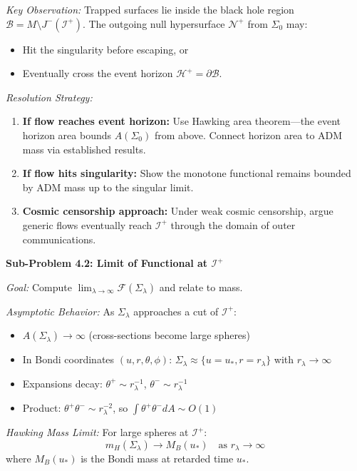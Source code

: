 \textit{Key Observation:} Trapped surfaces lie inside the black hole region $\mathcal{B} = M \setminus J^-(\mathscr{I}^+)$. The outgoing null hypersurface $\mathcal{N}^+$ from $\Sigma_0$ may:
\begin{itemize}
    \item Hit the singularity before escaping, or
    \item Eventually cross the event horizon $\mathcal{H}^+ = \partial\mathcal{B}$.
\end{itemize}

\textit{Resolution Strategy:}
\begin{enumerate}
    \item \textbf{If flow reaches event horizon:} Use Hawking area theorem---the event horizon area bounds $A(\Sigma_0)$ from above. Connect horizon area to ADM mass via established results.
    \item \textbf{If flow hits singularity:} Show the monotone functional remains bounded by ADM mass up to the singular limit.
    \item \textbf{Cosmic censorship approach:} Under weak cosmic censorship, argue generic flows eventually reach $\mathscr{I}^+$ through the domain of outer communications.
\end{enumerate}

\textbf{Sub-Problem 4.2: Limit of Functional at $\mathscr{I}^+$}

\textit{Goal:} Compute $\lim_{\lambda \to \infty} \mathcal{F}(\Sigma_\lambda)$ and relate to mass.

\textit{Asymptotic Behavior:} As $\Sigma_\lambda$ approaches a cut of $\mathscr{I}^+$:
\begin{itemize}
    \item $A(\Sigma_\lambda) \to \infty$ (cross-sections become large spheres)
    \item In Bondi coordinates $(u, r, \theta, \phi)$: $\Sigma_\lambda \approx \{u = u_*, r = r_\lambda\}$ with $r_\lambda \to \infty$
    \item Expansions decay: $\theta^+ \sim r_\lambda^{-1}$, $\theta^- \sim r_\lambda^{-1}$
    \item Product: $\theta^+\theta^- \sim r_\lambda^{-2}$, so $\int \theta^+\theta^- dA \sim O(1)$
\end{itemize}

\textit{Hawking Mass Limit:} For large spheres at $\mathscr{I}^+$:
\begin{equation}
    m_H(\Sigma_\lambda) \to M_B(u_*) \quad \text{as } r_\lambda \to \infty
\end{equation}
where $M_B(u_*)$ is the Bondi mass at retarded time $u_*$.

